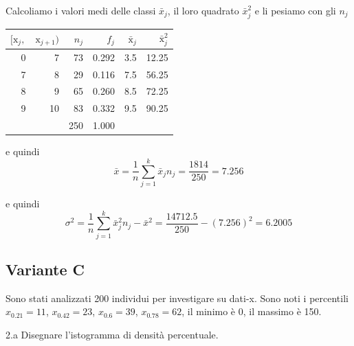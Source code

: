\documentclass[
  11pt,
]{book}
\theoremstyle{mytheoremstyle}
\theoremstyle{mydefstyle}
\newenvironment{sol}
  {
  \begin{tcolorbox}[enhanced,breakable,arc=0.1mm,boxrule=1pt,colback=white,colframe=iblue,
  title=\bf \fontfamily{lmss}\selectfont \hspace{.5 cm} Soluzione,drop fuzzy shadow]

}{
\end{tcolorbox}
  }
\begin{document}
\begin{sol}

Calcoliamo i valori medi delle classi \(\bar x_j\), il loro quadrato \(\bar x_j^2\) e li pesiamo con gli \(n_j\)

\begin{table}[H]
\centering
\begin{tabular}{rrrrrr}
\toprule
$[\text{x}_j,$ & $\text{x}_{j+1})$ & $n_j$ & $f_j$ & $\bar{\text{x}}_j$ & $\bar{\text{x}}_j^2$\\
\midrule
0 & 7 & 73 & 0.292 & 3.5 & 12.25\\
7 & 8 & 29 & 0.116 & 7.5 & 56.25\\
8 & 9 & 65 & 0.260 & 8.5 & 72.25\\
9 & 10 & 83 & 0.332 & 9.5 & 90.25\\
 &  & 250 & 1.000 &  & \\
\bottomrule
\end{tabular}
\end{table}

e quindi
\[
\bar x= \frac 1n\sum_{j=1}^k\bar x_jn_j=\frac{1814}{250}=7.256
\]

e quindi
\[
\sigma^2= \frac 1n\sum_{j=1}^k\bar x_j^2n_j-\bar x^2=\frac{14712.5}{250}-(7.256)^2=6.2005
\]

\end{sol}

\subsection{Variante C}\label{variante-c}

Sono stati analizzati 200 individui per investigare su dati-x. Sono noti i percentili
\(x_{0.21}=11\), \(x_{0.42}=23\), \(x_{0.6}=39\), \(x_{0.78}=62\), il minimo è 0, il massimo è 150.

2.a Disegnare l'istogramma di densità percentuale.
\end{document}
